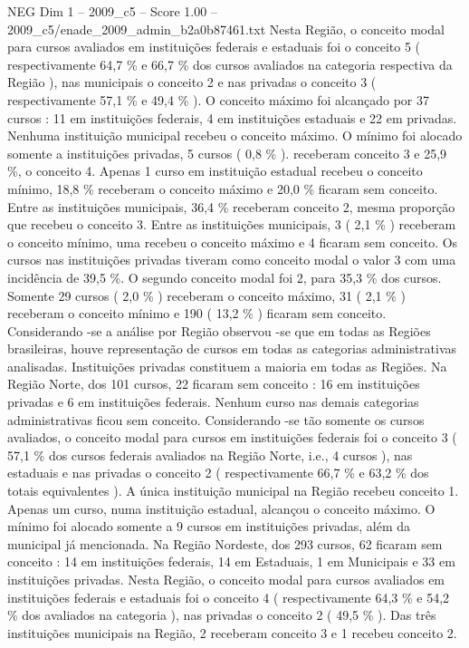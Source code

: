 \begin{textsample}{NEG Dim 1 – 2009\_c5 – Score 1.00 – 2009\_c5/enade\_2009\_admin\_b2a0b87461.txt}
Nesta Região, o conceito modal para cursos avaliados em instituições federais e estaduais foi o conceito 5 ( respectivamente 64,7 \% e 66,7 \% dos cursos avaliados na categoria respectiva da Região ), nas municipais o conceito 2 e nas privadas o conceito 3 ( respectivamente 57,1 \% e 49,4 \% ).
O conceito máximo foi alcançado por 37 cursos : 11 em instituições federais, 4 em instituições estaduais e 22 em privadas.
Nenhuma instituição municipal recebeu o conceito máximo.
O mínimo foi alocado somente a instituições privadas, 5 cursos ( 0,8 \% ). receberam conceito 3 e 25,9 \%, o conceito 4.
Apenas 1 curso em instituição estadual recebeu o conceito mínimo, 18,8 \% receberam o conceito máximo e 20,0 \% ficaram sem conceito.
Entre as instituições municipais, 36,4 \% receberam conceito 2, mesma proporção que recebeu o conceito 3.
Entre as instituições municipais, 3 ( 2,1 \% ) receberam o conceito mínimo, uma recebeu o conceito máximo e 4 ficaram sem conceito.
Os cursos nas instituições privadas tiveram como conceito modal o valor 3 com uma incidência de 39,5 \%.
O segundo conceito modal foi 2, para 35,3 \% dos cursos.
Somente 29 cursos ( 2,0 \% ) receberam o conceito máximo, 31 ( 2,1 \% ) receberam o conceito mínimo e 190 ( 13,2 \% ) ficaram sem conceito.
Considerando -se a análise por Região observou -se que em todas as Regiões brasileiras, houve representação de cursos em todas as categorias administrativas analisadas.
Instituições privadas constituem a maioria em todas as Regiões.
Na Região Norte, dos 101 cursos, 22 ficaram sem conceito : 16 em instituições privadas e 6 em instituições federais.
Nenhum curso nas demais categorias administrativas ficou sem conceito.
Considerando -se tão somente os cursos avaliados, o conceito modal para cursos em instituições federais foi o conceito 3 ( 57,1 \% dos cursos federais avaliados na Região Norte, i.e., 4 cursos ), nas estaduais e nas privadas o conceito 2 ( respectivamente 66,7 \% e 63,2 \% dos totais equivalentes ).
A única instituição municipal na Região recebeu conceito 1.
Apenas um curso, numa instituição estadual, alcançou o conceito máximo.
O mínimo foi alocado somente a 9 cursos em instituições privadas, além da municipal já mencionada.
Na Região Nordeste, dos 293 cursos, 62 ficaram sem conceito : 14 em instituições federais, 14 em Estaduais, 1 em Municipais e 33 em instituições privadas.
Nesta Região, o conceito modal para cursos avaliados em instituições federais e estaduais foi o conceito 4 ( respectivamente 64,3 \% e 54,2 \% dos avaliados na categoria ), nas privadas o conceito 2 ( 49,5 \% ).
Das três instituições municipais na Região, 2 receberam conceito 3 e 1 recebeu conceito 2.

\end{textsample}
